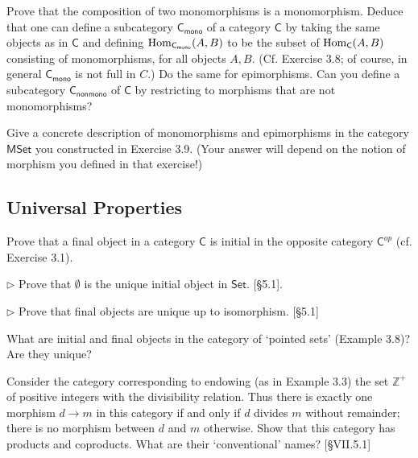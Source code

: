 \begin{problem}
  \def \C {\mathsf{C}}
  \def \mono {\mathsf{mono}}
  \def \nonmono {\mathsf{nonmono}}

  Prove that the composition of two monomorphisms is a monomorphism. Deduce
  that one can define a subcategory $\C_\mono$ of a category $\C$ by taking
  the same objects as in $\C$ and defining $\Hom_{\C_\mono}(A, B)$ to be the
  subset of $\Hom_\C(A, B)$ consisting of monomorphisms, for all objects $A,
  B$. (Cf. Exercise 3.8; of course, in general $\C_\mono$ is not full in
  $C$.) Do the same for epimorphisms. Can you define a subcategory
  $\C_\nonmono$ of $\C$ by restricting to morphisms that are not
  monomorphisms?
\end{problem}

\begin{problem}
  \def \MSet {\mathsf{MSet}}
  Give a concrete description of monomorphisms and epimorphisms in the
  category $\MSet$ you constructed in Exercise 3.9. (Your answer will depend
  on the notion of morphism you defined in that exercise!)
\end{problem}

\subsection{Universal Properties}

\begin{problem}
  \def \C {\mathsf{C}}
  \def \Cop {{\mathsf{C}^{op}}}
  Prove that a final object in a category $\C$ is initial in the opposite
  category $\Cop$ (cf. Exercise 3.1).
\end{problem}

\begin{problem}
  \def \Set {\mathsf{Set}}
  $\rhd$ Prove that $\emptyset$ is the unique initial object in $\Set$.
  [\S 5.1].
\end{problem}

\begin{problem}
  $\rhd$ Prove that final objects are unique up to isomorphism. [\S 5.1]
\end{problem}

\begin{problem}
  What are initial and final objects in the category of `pointed sets'
  (Example 3.8)? Are they unique?
\end{problem}

\begin{problem}
  Consider the category corresponding to endowing (as in Example 3.3) the set
  $\mathbb{Z}^+$ of positive integers with the divisibility relation. Thus
  there is exactly one morphism $d\to m$ in this category if and only if $d$
  divides $m$ without remainder; there is no morphism between $d$ and $m$
  otherwise. Show that this category has products and coproducts. What are
  their `conventional' names? [\S VII.5.1]
\end{problem}

